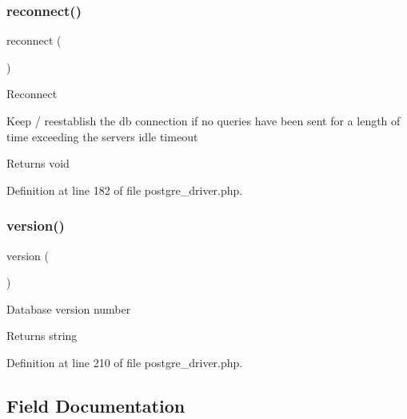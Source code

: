 \subsubsection{\texorpdfstring{reconnect()}{reconnect()}}
{\footnotesize\ttfamily reconnect (\begin{DoxyParamCaption}{ }\end{DoxyParamCaption})}

Reconnect

Keep / reestablish the db connection if no queries have been sent for a length of time exceeding the server\textquotesingle{}s idle timeout

\begin{DoxyReturn}{Returns}
void 
\end{DoxyReturn}


Definition at line 182 of file postgre\+\_\+driver.\+php.

\mbox{\label{class_c_i___d_b__postgre__driver_a6080dae0886626b9a4cedb29240708b1}} 
\subsubsection{\texorpdfstring{version()}{version()}}
{\footnotesize\ttfamily version (\begin{DoxyParamCaption}{ }\end{DoxyParamCaption})}

Database version number

\begin{DoxyReturn}{Returns}
string 
\end{DoxyReturn}


Definition at line 210 of file postgre\+\_\+driver.\+php.



\subsection{Field Documentation}
\mbox{\label{class_c_i___d_b__postgre__driver_a10213aa6e05f6d924d3277bb1d2fea00}} 
